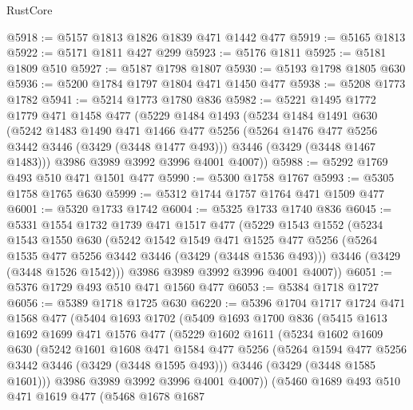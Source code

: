 \begin{lexlean}{RustCore}
\begin{coremodule}
@5918 := @5157 @1813 @1826 @1839 @471 @1442 @477
@5919 := @5165 @1813
@5922 := @5171 @1811 @427 @299
@5923 := @5176 @1811
@5925 := @5181 @1809 @510
@5927 := @5187 @1798 @1807
@5930 := @5193 @1798 @1805 @630
@5936 := @5200 @1784 @1797 @1804 @471 @1450 @477
@5938 := @5208 @1773 @1782
@5941 := @5214 @1773 @1780 @836
@5982 := @5221
    @1495
    @1772
    @1779
    @471
    @1458
    @477
    (@5229
      @1484
      @1493
      (@5234
        @1484
        @1491
        @630
        (@5242
          @1483
          @1490
          @471
          @1466
          @477
          @5256
          (@5264 @1476 @477 @5256 @3442 @3446 (@3429 (@3448 @1477 @493)))
          @3446
          (@3429 (@3448 @1467 @1483)))
        @3986
        @3989
        @3992
        @3996
        @4001
        @4007))
@5988 := @5292 @1769 @493 @510 @471 @1501 @477
@5990 := @5300 @1758 @1767
@5993 := @5305 @1758 @1765 @630
@5999 := @5312 @1744 @1757 @1764 @471 @1509 @477
@6001 := @5320 @1733 @1742
@6004 := @5325 @1733 @1740 @836
@6045 := @5331
    @1554
    @1732
    @1739
    @471
    @1517
    @477
    (@5229
      @1543
      @1552
      (@5234
        @1543
        @1550
        @630
        (@5242
          @1542
          @1549
          @471
          @1525
          @477
          @5256
          (@5264 @1535 @477 @5256 @3442 @3446 (@3429 (@3448 @1536 @493)))
          @3446
          (@3429 (@3448 @1526 @1542)))
        @3986
        @3989
        @3992
        @3996
        @4001
        @4007))
@6051 := @5376 @1729 @493 @510 @471 @1560 @477
@6053 := @5384 @1718 @1727
@6056 := @5389 @1718 @1725 @630
@6220 := @5396
    @1704
    @1717
    @1724
    @471
    @1568
    @477
    (@5404
      @1693
      @1702
      (@5409
        @1693
        @1700
        @836
        (@5415
          @1613
          @1692
          @1699
          @471
          @1576
          @477
          (@5229
            @1602
            @1611
            (@5234
              @1602
              @1609
              @630
              (@5242
                @1601
                @1608
                @471
                @1584
                @477
                @5256
                (@5264 @1594 @477 @5256 @3442 @3446 (@3429 (@3448 @1595 @493)))
                @3446
                (@3429 (@3448 @1585 @1601)))
              @3986
              @3989
              @3992
              @3996
              @4001
              @4007))
          (@5460
            @1689
            @493
            @510
            @471
            @1619
            @477
            (@5468
              @1678
              @1687

\end{coremodule}
\end{lexlean}
